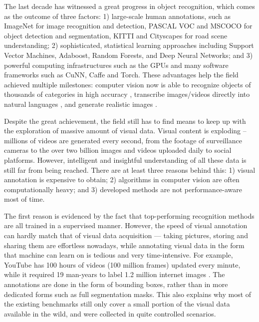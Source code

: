 The last decade has witnessed a great progress in object recognition, which comes as the outcome of three factors: 1)  large-scale human annotations, such as ImageNet \citep{imagenet} for image recognition and detection, PASCAL VOC \citep{pascal:2011} and MSCOCO \citep{coco:eccv} for object detection and segmentation, KITTI \citep{kitti} and Cityscapes \citep{cityscapes} for road scene understanding; 2) sophisticated, statistical learning approaches including Support Vector Machines, Adaboost, Random Forests, and Deep Neural Networks; and 3)  powerful computing infrastructures such as the GPUs and many software frameworks such as CuNN, Caffe and Torch. These advantages help the field achieved multiple milestones: computer vision now is able to recognize objects of thousands of categories in high accuracy \citep{deepnet:nips12, vgg16, ResNet}, transcribe images/videos directly into natural languages \citep{show:tell:caption}, and generate realistic images \citep{draw:2015}. 

Despite the great achievement, the field still has to find means to keep up with the exploration of massive amount of visual data.  Visual content is exploding -- millions of videos are generated every second, from the footage of surveillance cameras to the over two billion images and videos uploaded daily to social platforms. However, intelligent and insightful understanding of all these data is still far from being reached.  There are at least three reasons behind this: 1) visual annotation is expensive to obtain; 2)  algorithms in computer vision are often computationally heavy; and 3) developed methods are not performance-aware most of time.   

The first reason is evidenced by the fact that top-performing recognition methods are all trained in a supervised manner. However, the speed of visual annotation can hardly match that of visual data acquisition --- taking pictures, storing and sharing them are effortless nowadays, while annotating visual data in the form that machine can learn on is tedious and very time-intensive. 
For example, 
YouTube has 100 hours of videos (100 million frames) updated every minute, while it required 19 man-years to label 1.2 million internet images \citep{imagenet}. The annotations are done in the form of bounding boxes, rather than in more dedicated forms such as full segmentation masks.  This also explains why most of the existing benchmarks still only cover a small portion of the visual data  available in the wild, and were collected in quite controlled scenarios. 

